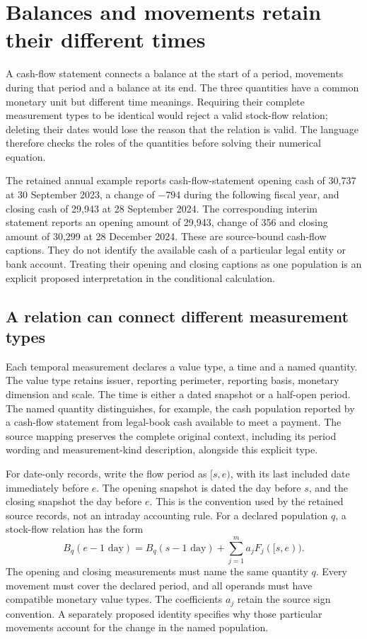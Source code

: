 \section{Balances and movements retain their different times}
\label{sec:temporal-statement-network}

A cash-flow statement connects a balance at the start of a period, movements
during that period and a balance at its end. The three quantities have a common
monetary unit but different time meanings. Requiring their complete measurement
types to be identical would reject a valid stock-flow relation; deleting their
dates would lose the reason that the relation is valid. The language therefore
checks the roles of the quantities before solving their numerical equation.

The retained annual example reports cash-flow-statement opening cash of 30,737
at 30 September 2023, a change of \(-794\) during the following fiscal year,
and closing cash of 29,943 at 28 September 2024. The corresponding interim
statement reports an opening amount of 29,943, change of 356 and closing amount
of 30,299 at 28 December 2024. These are source-bound cash-flow captions.
They do not identify the available cash of a particular legal entity or bank
account. Treating their opening and closing captions as one population is an
explicit proposed interpretation in the conditional calculation.

\subsection{A relation can connect different measurement types}

Each temporal measurement declares a value type, a time and a named quantity.
The value type retains issuer, reporting perimeter, reporting basis, monetary
dimension and scale. The time is either a dated snapshot or a half-open period.
The named quantity distinguishes, for example, the cash population reported by
a cash-flow statement from legal-book cash available to meet a payment. The
source mapping preserves the complete original context, including its period
wording and measurement-kind description, alongside this explicit type.

For date-only records, write the flow period as \([s,e)\), with its last
included date immediately before \(e\). The opening snapshot is dated the day
before \(s\), and the closing snapshot the day before \(e\). This is the
convention used by the retained source records, not an intraday accounting rule.
For a declared population \(q\), a stock-flow relation has the form
\begin{equation}
\label{eq:temporal-network-bridge}
 B_q(e-1\text{ day})
 =B_q(s-1\text{ day})+\sum_{j=1}^{m}a_j F_j([s,e)).
\end{equation}
The opening and closing measurements must name the same quantity \(q\).
Every movement must cover the declared period, and all operands must have
compatible monetary value types. The coefficients \(a_j\) retain the source
sign convention. A separately proposed identity specifies why those particular
movements account for the change in the named population.

